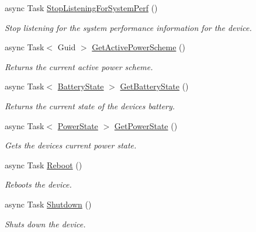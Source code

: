 \begin{DoxyCompactItemize}
async Task \hyperlink{class_microsoft_1_1_tools_1_1_windows_device_portal_1_1_device_portal_acfaa8befd4604c097f082228158ed984}{Stop\+Listening\+For\+System\+Perf} ()
\begin{DoxyCompactList}\small\item\em Stop listening for the system performance information for the device. \end{DoxyCompactList}\item 
async Task$<$ Guid $>$ \hyperlink{class_microsoft_1_1_tools_1_1_windows_device_portal_1_1_device_portal_a0618403bd3e96aa438f027df600e63fc}{Get\+Active\+Power\+Scheme} ()
\begin{DoxyCompactList}\small\item\em Returns the current active power scheme. \end{DoxyCompactList}\item 
async Task$<$ \hyperlink{class_microsoft_1_1_tools_1_1_windows_device_portal_1_1_device_portal_1_1_battery_state}{Battery\+State} $>$ \hyperlink{class_microsoft_1_1_tools_1_1_windows_device_portal_1_1_device_portal_a2c2741fff73de38da84b9c4808900fa2}{Get\+Battery\+State} ()
\begin{DoxyCompactList}\small\item\em Returns the current state of the device\textquotesingle{}s battery. \end{DoxyCompactList}\item 
async Task$<$ \hyperlink{class_microsoft_1_1_tools_1_1_windows_device_portal_1_1_device_portal_1_1_power_state}{Power\+State} $>$ \hyperlink{class_microsoft_1_1_tools_1_1_windows_device_portal_1_1_device_portal_aabb20cb4b8992ab91d8442f992bca4d0}{Get\+Power\+State} ()
\begin{DoxyCompactList}\small\item\em Gets the device\textquotesingle{}s current power state. \end{DoxyCompactList}\item 
async Task \hyperlink{class_microsoft_1_1_tools_1_1_windows_device_portal_1_1_device_portal_a8bb183da706d0c582b1edc6ff4af4d84}{Reboot} ()
\begin{DoxyCompactList}\small\item\em Reboots the device. \end{DoxyCompactList}\item 
async Task \hyperlink{class_microsoft_1_1_tools_1_1_windows_device_portal_1_1_device_portal_a64f88cb8d9210ec717c2c6da0a7cb21b}{Shutdown} ()
\begin{DoxyCompactList}\small\item\em Shuts down the device. \end{DoxyCompactList}\item 

\end{DoxyCompactItemize}
